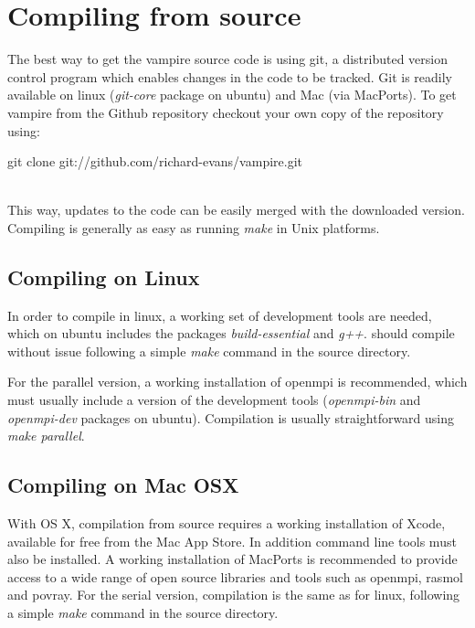 \section*{Compiling from source}
The best way to get the vampire source code is using git, a distributed version control program which enables changes in the code to be tracked. Git is readily available on linux (\textit{git-core} package on ubuntu) and Mac (via MacPorts). To get vampire from the Github repository checkout your own copy of the repository using:\\

\begin{minipage}[c]{\textwidth}
\centering
git clone git://github.com/richard-evans/vampire.git
\end{minipage}\\

This way, updates to the code can be easily merged with the downloaded version. Compiling is generally as easy as running \textit{make} in Unix platforms.

\subsection*{Compiling on Linux}
In order to compile in linux, a working set of development tools are needed, which on ubuntu includes the packages \textit{build-essential} and \textit{g++}. 
\vampire should compile without issue following a simple \textit{make} command in the source directory.

For the parallel version, a working installation of openmpi is recommended, which must usually include a version of the development tools (\textit{openmpi-bin} and \textit{openmpi-dev} packages on ubuntu). Compilation is usually straightforward using \textit{make parallel}.

\subsection*{Compiling on Mac OSX}
 With OS X, compilation from source requires a working installation of Xcode, available for free from the Mac App Store. In addition command line tools must also be installed. A working installation of MacPorts is recommended to provide access to a wide range of open source libraries and tools such as openmpi, rasmol and povray. For the serial version, compilation is the same as for linux, following a simple \textit{make} command in the source directory.

